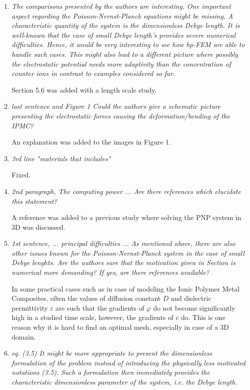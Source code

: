 \documentclass[mathpazo]{cicp}
\begin{document}
\begin{enumerate}
\item \emph{The comparisons presented by the authors are interesting. One important aspect regarding the
Poisson-Nernst-Planck equations might be missing. A characteristic quantity of the system is the
dimensionless Debye length. It is well-known that the case of small Debye length’s provides severe
numerical difficulties. Hence, it would be very interesting to see how hp-FEM are able to handle
such cases. This might also lead to a different picture where possibly the electrostatic potential
needs more adaptivity than the concentration of counter ions in contrast to examples considered so
far.}

Section 5.6 was added with a length scale study.

\item \emph{last sentence and Figure 1 Could the authors give a schematic picture presenting the electrostatic forces causing the deformation/bending of the IPMC?}

An explanation was added to the images in Figure 1.

\item \emph{3rd line "materials that includes"}

Fixed.

\item \emph{2nd paragraph, The computing power ... Are there references which elucidate this statement?}

A reference was added to a previous study where solving the PNP system in 3D was discussed.

\item \emph{1st sentence, ... principal difficulties ... As mentioned above, there are also other issues
known for the Poisson-Nernst-Planck system in the case of small Debye lenghts. Are the
authors sure that the motivation given in Section is numerical more demanding? If yes, are
there references available?}

In some practical cases such as in case of modeling the Ionic Polymer Metal Composites,
often the values of diffusion constant $D$ and dielectric permittivity $\varepsilon$ are such
that the gradients of $\varphi$ do not become significantly high in a studied time scale, however,
the gradients of $c$ do. This is one reason why it is hard to find an optimal mesh, especially
in case of a 3D domain.

\item \emph{eq. (3.5) It might be more appropriate to present the dimensionless formulation of the problem instead of introducing the physically less motivated notations (3.5). Such a formulation then
immediately provides the characteristic dimensionless parameter of the system, i.e. the Debye
length.}


\end{enumerate}
\end{document}
